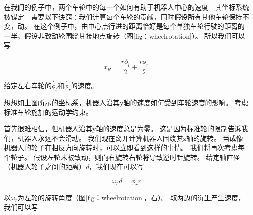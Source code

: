 在我们的例子中，两个车轮中的每一个如何有助于机器人中心的速度 - 其坐标系统被锚定 - 需要以下诀窍：我们计算每个车轮的贡献，同时假设所有其他车轮保持不变，动。 在这个例子中，由中心点行进的距离恰好是每个单独车轮行驶的距离的一半，假设非致动轮围绕其接地点旋转（图\ref {fig：wheelrotation}）。 所以我们可以写

\begin{equation}
\dot{x_R}=\frac{r\dot{\phi_l}}{2}+\frac{r\dot{\phi_r}}{2}
\end{equation}

给定左右车轮的$ \dot {\phi_l} $和$ \dot {\phi_r} $的速度。

\begin{framed}
想想如上图所示的坐标系，机器人沿其y轴的速度如何受到车轮速度的影响。 考虑标准车轮施加的运动学约束。
\end{framed}


首先很难相信，但机器人沿其y轴的速度总是为零。 这是因为标准轮的限制告诉我们，机器人永远不会滑动。 我们现在离开计算机器人围绕其z轴的旋转。 当成像机器人的轮子在相反方向旋转时，可以立即看到这样的事情。 我们将再次考虑每个轮子。 假设左轮未被致动，则向右旋转右轮将导致逆时针旋转。 给定轴直径（机器人轮子之间的距离）$ d $，我们现在可以写

\begin{equation}
\omega_r d = \phi_r r
\end{equation}

以$ \omega_r $为左轮的旋转角度（图\ref {fig：wheelrotation}，右）。 取两边的衍生产生速度，我们可以写

